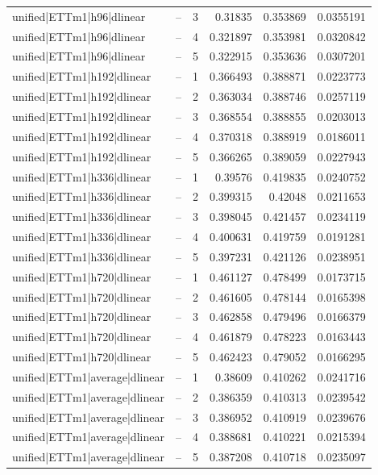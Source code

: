 \begin{longtable}{llrrrr}
unified|ETTm1|h96|dlinear & -- & 3 & 0.31835 & 0.353869 & 0.0355191 \\
unified|ETTm1|h96|dlinear & -- & 4 & 0.321897 & 0.353981 & 0.0320842 \\
unified|ETTm1|h96|dlinear & -- & 5 & 0.322915 & 0.353636 & 0.0307201 \\
unified|ETTm1|h192|dlinear & -- & 1 & 0.366493 & 0.388871 & 0.0223773 \\
unified|ETTm1|h192|dlinear & -- & 2 & 0.363034 & 0.388746 & 0.0257119 \\
unified|ETTm1|h192|dlinear & -- & 3 & 0.368554 & 0.388855 & 0.0203013 \\
unified|ETTm1|h192|dlinear & -- & 4 & 0.370318 & 0.388919 & 0.0186011 \\
unified|ETTm1|h192|dlinear & -- & 5 & 0.366265 & 0.389059 & 0.0227943 \\
unified|ETTm1|h336|dlinear & -- & 1 & 0.39576 & 0.419835 & 0.0240752 \\
unified|ETTm1|h336|dlinear & -- & 2 & 0.399315 & 0.42048 & 0.0211653 \\
unified|ETTm1|h336|dlinear & -- & 3 & 0.398045 & 0.421457 & 0.0234119 \\
unified|ETTm1|h336|dlinear & -- & 4 & 0.400631 & 0.419759 & 0.0191281 \\
unified|ETTm1|h336|dlinear & -- & 5 & 0.397231 & 0.421126 & 0.0238951 \\
unified|ETTm1|h720|dlinear & -- & 1 & 0.461127 & 0.478499 & 0.0173715 \\
unified|ETTm1|h720|dlinear & -- & 2 & 0.461605 & 0.478144 & 0.0165398 \\
unified|ETTm1|h720|dlinear & -- & 3 & 0.462858 & 0.479496 & 0.0166379 \\
unified|ETTm1|h720|dlinear & -- & 4 & 0.461879 & 0.478223 & 0.0163443 \\
unified|ETTm1|h720|dlinear & -- & 5 & 0.462423 & 0.479052 & 0.0166295 \\
unified|ETTm1|average|dlinear & -- & 1 & 0.38609 & 0.410262 & 0.0241716 \\
unified|ETTm1|average|dlinear & -- & 2 & 0.386359 & 0.410313 & 0.0239542 \\
unified|ETTm1|average|dlinear & -- & 3 & 0.386952 & 0.410919 & 0.0239676 \\
unified|ETTm1|average|dlinear & -- & 4 & 0.388681 & 0.410221 & 0.0215394 \\
unified|ETTm1|average|dlinear & -- & 5 & 0.387208 & 0.410718 & 0.0235097 \\

\end{longtable}
